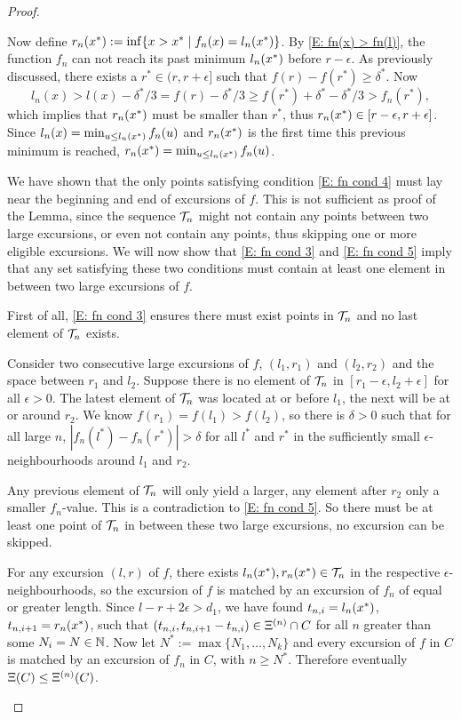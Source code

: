\begin{proof}
\begin{proofpart}
Now define 
$r_n(x^*) := \inf \{ x > x^* \; | \; f_n(x) = l_n(x^*) \}$.
By \eqref{E: fn(x) > fn(l)}, the function $f_n$ can not reach its past minimum $l_n(x^*)$
before $r-\epsilon$.
As previously discussed,
there exists a $r^* \in (r, r+\epsilon]$ such that $f(r) - f(r^*) \geq \delta^*$.
Now
\begin{equation}
l_n(x) > l(x) - \delta^* / 3 = f(r) - \delta^* / 3 \geq f(r^*) + \delta^* - \delta^* / 3 > f_n(r^*),
\end{equation}
which implies that $r_n(x^*)$ must be smaller than $r^*$,
thus $r_n(x^*) \in [r - \epsilon, r+ \epsilon]$.
Since $l_n(x) = \min_{u \leq l_n(x^*)} f_n(u)$
and $r_n(x^*)$ is the first time this previous minimum is reached,
$r_n(x^*) = \min_{u \leq l_n(x^*)} f_n(u)$.


We have shown that the only points satisfying condition \eqref{E: fn cond 4} must lay near the beginning and end of excursions of $f$.
This is not sufficient as proof of the Lemma, since the sequence $\mathcal{T}_n$ might not contain any points between two large excursions,
or even not contain any points, thus skipping one or more eligible excursions.
We will now show that \eqref{E: fn cond 3} and \eqref{E: fn cond 5} imply 
that any set satisfying these two conditions must contain at least one element in between two large excursions of $f$.

First of all, \eqref{E: fn cond 3} ensures there must exist points in $\mathcal{T}_n$ and no last element of $\mathcal{T}_n$ exists.

Consider two consecutive large excursions of $f$, $(l_1, r_1)$ and $(l_2, r_2)$
and the space between $r_1$ and $l_2$.
Suppose there is no element of $\mathcal{T}_n$ in $[r_1-\epsilon, l_2+\epsilon]$ for all $\epsilon>0$.
The latest element of $\mathcal{T}_n$ was located at or before $l_1$, the next will be at or around $r_2$.
We know $f(r_1)=f(l_1) > f(l_2)$, so there is $\delta>0$ such that for all large $n$,
$|f_n(l^*) - f_n(r^*)|> \delta$ for all $l^*$ and $r^*$ in the sufficiently small $\epsilon$-neighbourhoods around $l_1$ and $r_2$.

Any previous element of $\mathcal{T}_n$ will only yield a larger, any element after $r_2$ only a smaller $f_n$-value.
This is a contradiction to \eqref{E: fn cond 5}.
So there must be at least one point of $\mathcal{T}_n$ in between these two large excursions, no excursion can be skipped.

For any excursion $(l,r)$ of $f$, there exists $l_n(x^*), r_n(x^*) \in \mathcal{T}_n$ in the respective $\epsilon$-neighbourhoods,
so the excursion of $f$ is matched by an excursion of $f_n$ of equal or greater length.
Since $l - r + 2\epsilon > d_1$,
we have found $t_{n, i} = l_n(x^*)$, $t_{n, i+1} = r_n(x^*)$,
such that $(t_{n, i}, t_{n, i+1} - t_{n, i}) \in \Xi^{(n)} \cap C$
for all $n$ greater than some $N_i = N \in \mathbb{N}$.
Now let $N^* := \max\{N_1, \dots, N_k\}$ 
and every excursion of $f$ in $C$ is matched by an excursion of $f_n$ in $C$,
with $n \geq N^*$.
Therefore eventually $\Xi (C) \leq \Xi^{(n)}(C)$.
\end{proofpart}



\end{proof}
